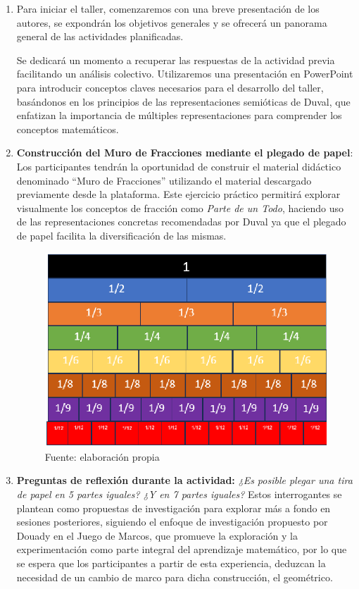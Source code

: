 \begin{enumerate}
	\item Para iniciar el taller, comenzaremos con una breve presentación de los autores, se expondrán los objetivos generales y se ofrecerá un panorama general de las actividades planificadas.
	
	Se dedicará un momento a recuperar las respuestas de la actividad previa facilitando un análisis colectivo. Utilizaremos una presentación en PowerPoint para introducir conceptos claves necesarios para el desarrollo del taller, basándonos en los principios de las representaciones semióticas de Duval, que enfatizan la importancia de múltiples representaciones para comprender los conceptos matemáticos.
	
	\item \textbf{Construcción del Muro de Fracciones mediante el plegado de papel}: Los	participantes tendrán la oportunidad de construir el material didáctico denominado ``Muro de Fracciones'' utilizando el material descargado previamente desde la plataforma. Este ejercicio práctico permitirá explorar visualmente los conceptos de fracción como \textit{Parte de un Todo}, haciendo uso de las representaciones concretas recomendadas por Duval ya que el plegado de papel facilita la diversificación de las mismas.
	
	\begin{figure}
		\centering
		\includegraphics[width=0.6\linewidth]{Trabajos/06/Anexos/grafico_01}
		\caption{Fuente: elaboración propia}
		\label{fig:grafico_06_01}
	\end{figure}
	
	\item \textbf{Preguntas de reflexión durante la actividad:} \textit{¿Es posible plegar una tira de papel en 5 partes iguales? ¿Y en 7 partes iguales?} Estos interrogantes se plantean como propuestas de investigación para explorar más a fondo en sesiones posteriores, siguiendo el enfoque de investigación propuesto por Douady en el Juego de Marcos, que promueve la exploración y la experimentación como parte integral del aprendizaje matemático, por lo que se espera que los participantes a partir de esta experiencia, deduzcan la necesidad de un cambio de marco para dicha construcción, el geométrico.
	

\end{enumerate}
